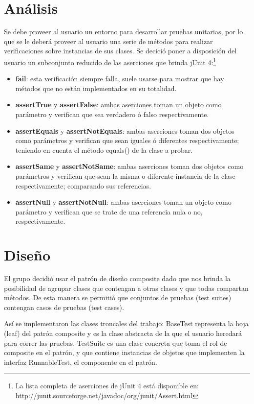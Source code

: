 \documentclass[12pt]{article}
\begin{document}
\section{Análisis}
Se debe proveer al usuario un entorno para desarrollar pruebas unitarias, por lo
que se le deberá proveer al usuario una serie de métodos para realizar 
verificaciones sobre instancias de sus clases. Se decició poner a disposición 
del usuario un subconjunto reducido de las aserciones que brinda jUnit 4:\footnote{
La lista completa de aserciones de jUnit 4 está disponible en: \\
http://junit.sourceforge.net/javadoc/org/junit/Assert.html}
	\begin{itemize}
		\item \textbf{fail}: esta verificación siempre falla, suele usarse para
			mostrar que hay métodos que no están implementados
			en su totalidad.
		\item \textbf{assertTrue} y \textbf{assertFalse}: ambas aserciones toman un 
			objeto como parámetro y verifican que sea verdadero ó 
			falso respectivamente.
		\item \textbf{assertEquals} y \textbf{assertNotEquals}: ambas aserciones toman dos
			objetos como parámetros y verifican que sean iguales ó 
			diferentes respectivamente; teniendo en cuenta el método
			equals() de la clase a probar.
		\item \textbf{assertSame} y \textbf{assertNotSame}: ambas aserciones toman dos 
			objetos como parámetros y verifican que sean la misma 
			o diferente instancia de la clase respectivamente; 
			comparando sus referencias.
		\item \textbf{assertNull} y \textbf{assertNotNull}: ambas aserciones toman un 
			objeto como parámetro y verifican que se trate de una
			referencia nula o no, respectivamente.
	\end{itemize}
	
	
\section{Diseño}
El grupo decidió usar el patrón de diseño composite dado que nos brinda la 
posibilidad de agrupar clases que contengan a otras clases y que todas compartan
métodos. De esta manera se permitió que conjuntos de pruebas (test suites) 
contengan casos de pruebas (test cases).

Así se implementaron las clases troncales del trabajo: BaseTest representa la 
hoja (leaf) del patrón composite y es la clase abstracta de la que el usuario 
heredará para correr las pruebas. TestSuite es una clase concreta que toma el 
rol de composite en el patrón, y que contiene instancias de objetos que 
implementen la interfaz RunnableTest, el componente en el patrón.
\end{document}
